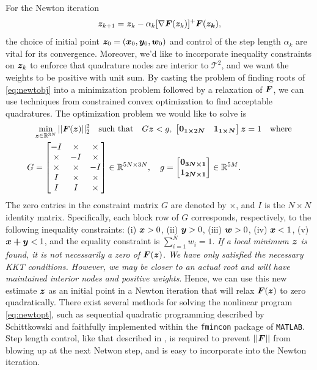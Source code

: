 For the Newton iteration 
\begin{equation}
	\boldsymbol{z}_{k+1} = \boldsymbol{z}_k - \alpha_k[\nabla \boldsymbol{F}(\boldsymbol{z}_k)]^+\boldsymbol{F}(\boldsymbol{z_k}),
\end{equation}
the choice of initial point $\boldsymbol{z}_0 = (\boldsymbol{x}_0,\boldsymbol{y}_0,\boldsymbol{w}_0)$ and control of the step length $\alpha_k$ are vital for its convergence. Moreover, we'd like to incorporate inequality constraints on $\boldsymbol{z}_k$ to enforce that quadrature nodes are interior to $\mathcal{T}^2$, and we want the weights to be positive with unit sum. By casting the problem of finding roots of \eqref{eq:newtobj} into a minimization problem followed by a relaxation of $\boldsymbol{F}$, we can use techniques from constrained convex optimization to find acceptable quadratures. The optimization problem we would like to solve is 
\begin{equation}\label{eq:newtopt}
\begin{split}
&\min_{\boldsymbol{z} \in \mathbb{R}^{3N}}||\boldsymbol{F}(\boldsymbol{z})||_2^2 \quad\text{such that}\quad G\boldsymbol{z} < g,\; \begin{bmatrix} \boldsymbol{0_{1\times 2N}} & \boldsymbol{1_{1\times N}}\end{bmatrix}\boldsymbol{z} = 1 \quad\text{where}\\ G &= \begin{bmatrix} -I & \times & \times \\\times & -I & \times \\ \times &\times  & -I \\ I & \times & \times \\ I & I & \times \end{bmatrix} \in \mathbb{R}^{5N\times 3N},\quad
g = \begin{bmatrix} \boldsymbol{0_{3N\times 1}} \\ \boldsymbol{1_{2N\times 1}} \end{bmatrix} \in \mathbb{R}^{5M}.
\end{split}
\end{equation}
The zero entries in the constraint matrix $G$ are denoted by $\times$, and $I$ is the $N\times N$ identity matrix. Specifically, each block row of $G$ corresponds, respectively, to the following inequality constraints: (i) $\boldsymbol{x} > 0$, (ii) $\boldsymbol{y} > 0$, (iii) $\boldsymbol{w} > 0$, (iv) $\boldsymbol{x} < 1$, (v) $\boldsymbol{x+y} < 1$, and the equality constraint is $\sum_{i=1}^N w_i = 1$. \emph{If a local minimum $\boldsymbol{z}$ is found, it is not necessarily a zero of $\boldsymbol{F}(\boldsymbol{z})$. We have only satisfied the necessary KKT conditions. However, we may be closer to an actual root and will have maintained interior nodes and positive weights}. Hence, we can use this new estimate $\boldsymbol{z}$ as an initial point in a Newton iteration that will relax $\boldsymbol{F}(\boldsymbol{z})$ to zero quadratically. There exist several methods for solving the nonlinear program \eqref{eq:newtopt}, such as sequential quadratic programming described by Schittkowski \cite{sqp} and faithfully implemented within the \texttt{fmincon} package of \texttt{MATLAB}. Step length control, like that described in \cite{polyak}, is required to prevent $||\boldsymbol{F}||$ from blowing up at the next Netwon step, and is easy to incorporate into the Newton iteration.
